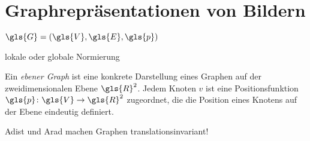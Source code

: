 \chapter{Graphrepräsentationen von Bildern}
\label{graphrepraesentationen_von_bildern}

$\gls{G} = \left(\gls{V}, \gls{E}, \gls{p}\right)$

lokale oder globale Normierung

Ein \emph{ebener Graph} ist eine konkrete Darstellung eines Graphen auf der zweidimensionalen Ebene $\gls{R}^2$.
Jedem Knoten $v$ ist eine Positionsfunktion $\gls{p} \colon \gls{V} \to \gls{R}^2$ zugeordnet, die die Position eines Knotens auf der Ebene eindeutig definiert.

\gls{Adist} und \gls{Arad} machen Graphen translationsinvariant!




